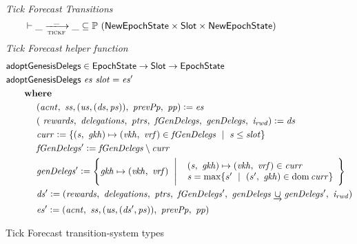 \begin{figure}
  \emph{Tick Forecast Transitions}
  \begin{equation*}
    \vdash \var{\_} \trans{tickf}{\_} \var{\_} \subseteq
    \powerset (\NewEpochState \times \Slot \times \NewEpochState)
  \end{equation*}  %
  \emph{Tick Forecast helper function}
  \begin{align*}
      & \mathsf{adoptGenesisDelegs} \in \mathsf{EpochState} \to \mathsf{Slot} \to \mathsf{EpochState}
      \\
      & \mathsf{adoptGenesisDelegs}~\mathit{es}~\mathit{slot} = \mathit{es'}
      \\
      & ~~~~~ ~ \mathbf{where}~ ~ 
      \\
      & ~~~~~~~~~~
      (\mathit{acnt},~\mathit{ss},(\mathit{us},(\mathit{ds},\mathit{ps})),~\mathit{prevPp},~\mathit{pp})
      \mathrel{\mathop:}=\mathit{es}
      \\
      & ~~~~~~~~~~
      (~\mathit{rewards},~\mathit{delegations},~\mathit{ptrs},
      ~\mathit{fGenDelegs},~\mathit{genDelegs},~\mathit{i_{rwd}})\mathrel{\mathop:}=\mathit{ds}
      \\
      & ~~~~~~~~~~\mathit{curr}\mathrel{\mathop:}=
        \{
          (\mathit{s},~\mathit{gkh})\mapsto(\mathit{vkh},~\mathit{vrf})\in\mathit{fGenDelegs}
          ~\mid~
          \mathit{s}\leq\mathit{slot}
        \}
      \\
      & ~~~~~~~~~~\mathit{fGenDelegs'}\mathrel{\mathop:}=
          \mathit{fGenDelegs}\setminus\mathit{curr}
      \\
      & ~~~~~~~~~~\mathit{genDelegs'}\mathrel{\mathop:}=
          \left\{
            \mathit{gkh}\mapsto(\mathit{vkh},~\mathit{vrf})
            ~\mathrel{\Bigg|}~
            {
              \begin{array}{l}
                (\mathit{s},~\mathit{gkh})\mapsto(\mathit{vkh},~\mathit{vrf})\in\mathit{curr}\\
                \mathit{s}=\max\{s'~\mid~(s',~\mathit{gkh})\in\operatorname{dom}{\mathit{curr}}\}
              \end{array}
            }
          \right\}
      \\
      & ~~~~~~~~~~\mathit{ds'}\mathrel{\mathop:}=
          (\mathit{rewards},~\mathit{delegations},~\mathit{ptrs},
          ~\mathit{fGenDelegs'},~\mathit{genDelegs}\mathbin{\underrightarrow\cup}\mathit{genDelegs'},~\mathit{i_{rwd}})
      \\
      & ~~~~~~~~~~\mathit{es'}\mathrel{\mathop:}=
      (\mathit{acnt},~\mathit{ss},(\mathit{us},(\mathit{ds'},\mathit{ps})),~\mathit{prevPp},~\mathit{pp})
  \end{align*}
  \caption{Tick Forecast transition-system types}
  \label{fig:ts-types:tickf}
\end{figure}

